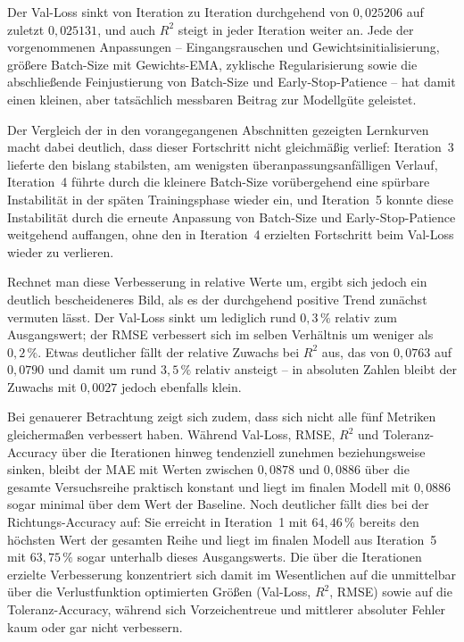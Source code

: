 Der Val-Loss sinkt von Iteration zu Iteration durchgehend von $0{,}025206$ auf zuletzt $0{,}025131$, und auch $R^2$ steigt in jeder Iteration weiter an. Jede der vorgenommenen Anpassungen -- Eingangsrauschen und Gewichtsinitialisierung, größere Batch-Size mit Gewichts-EMA, zyklische Regularisierung sowie die abschließende Feinjustierung von Batch-Size und Early-Stop-Patience -- hat damit einen kleinen, aber tatsächlich messbaren Beitrag zur Modellgüte geleistet.

Der Vergleich der in den vorangegangenen Abschnitten gezeigten Lernkurven macht dabei deutlich, dass dieser Fortschritt nicht gleichmäßig verlief: Iteration~3 lieferte den bislang stabilsten, am wenigsten überanpassungsanfälligen Verlauf, Iteration~4 führte durch die kleinere Batch-Size vorübergehend eine spürbare Instabilität in der späten Trainingsphase wieder ein, und Iteration~5 konnte diese Instabilität durch die erneute Anpassung von Batch-Size und Early-Stop-Patience weitgehend auffangen, ohne den in Iteration~4 erzielten Fortschritt beim Val-Loss wieder zu verlieren.

Rechnet man diese Verbesserung in relative Werte um, ergibt sich jedoch ein deutlich bescheideneres Bild, als es der durchgehend positive Trend zunächst vermuten lässt. Der Val-Loss sinkt um lediglich rund $0{,}3\,\%$ relativ zum Ausgangswert; der RMSE verbessert sich im selben Verhältnis um weniger als $0{,}2\,\%$. Etwas deutlicher fällt der relative Zuwachs bei $R^2$ aus, das von $0{,}0763$ auf $0{,}0790$ und damit um rund $3{,}5\,\%$ relativ ansteigt -- in absoluten Zahlen bleibt der Zuwachs mit $0{,}0027$ jedoch ebenfalls klein.

Bei genauerer Betrachtung zeigt sich zudem, dass sich nicht alle fünf Metriken gleichermaßen verbessert haben. Während Val-Loss, RMSE, $R^2$ und Toleranz-Accuracy über die Iterationen hinweg tendenziell zunehmen beziehungsweise sinken, bleibt der MAE mit Werten zwischen $0{,}0878$ und $0{,}0886$ über die gesamte Versuchsreihe praktisch konstant und liegt im finalen Modell mit $0{,}0886$ sogar minimal über dem Wert der Baseline. Noch deutlicher fällt dies bei der Richtungs-Accuracy auf: Sie erreicht in Iteration~1 mit $64{,}46\,\%$ bereits den höchsten Wert der gesamten Reihe und liegt im finalen Modell aus Iteration~5 mit $63{,}75\,\%$ sogar unterhalb dieses Ausgangswerts. Die über die Iterationen erzielte Verbesserung konzentriert sich damit im Wesentlichen auf die unmittelbar über die Verlustfunktion optimierten Größen (Val-Loss, $R^2$, RMSE) sowie auf die Toleranz-Accuracy, während sich Vorzeichentreue und mittlerer absoluter Fehler kaum oder gar nicht verbessern.

